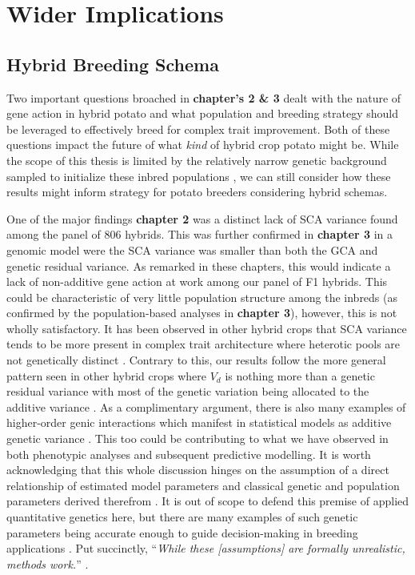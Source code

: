 \documentclass[
]{article}
\begin{document}
\section{Wider Implications}\label{wider-implications}

\subsection{Hybrid Breeding Schema}\label{hybrid-breeding-schema}

Two important questions broached in \textbf{chapter's 2 \& 3} dealt with
the nature of gene action in hybrid potato and what population and
breeding strategy should be leveraged to effectively breed for complex
trait improvement. Both of these questions impact the future of what
\emph{kind} of hybrid crop potato might be. While the scope of this
thesis is limited by the relatively narrow genetic background sampled to
initialize these inbred populations \autocite{Lindhout2018}, we can
still consider how these results might inform strategy for potato
breeders considering hybrid schemas.

One of the major findings \textbf{chapter 2} was a distinct lack of SCA
variance found among the panel of 806 hybrids. This was further
confirmed in \textbf{chapter 3} in a genomic model were the SCA variance
was smaller than both the GCA and genetic residual variance. As remarked
in these chapters, this would indicate a lack of non-additive gene
action at work among our panel of F1 hybrids. This could be
characteristic of very little population structure among the inbreds (as
confirmed by the population-based analyses in \textbf{chapter 3}),
however, this is not wholly satisfactory. It has been observed in other
hybrid crops that SCA variance tends to be more present in complex trait
architecture where heterotic pools are not genetically distinct
\autocite{Zhao2015b}. Contrary to this, our results follow the more
general pattern seen in other hybrid crops where \(V_d\) is nothing more
than a genetic residual variance with most of the genetic variation
being allocated to the additive variance \autocite{Bernardo2016}. As a
complimentary argument, there is also many examples of higher-order
genic interactions which manifest in statistical models as additive
genetic variance \autocite{Hill2008,Monnahan2015}. This too could be
contributing to what we have observed in both phenotypic analyses and
subsequent predictive modelling. It is worth acknowledging that this
whole discussion hinges on the assumption of a direct relationship of
estimated model parameters and classical genetic and population
parameters derived therefrom \autocite{Campos2015}. It is out of scope
to defend this premise of applied quantitative genetics here, but there
are many examples of such genetic parameters being accurate enough to
guide decision-making in breeding applications
\autocite{Walsh2004,Daetwyler2013}. Put succinctly, ``\emph{While these
{[}assumptions{]} are formally unrealistic, methods work.}''
\autocite{Hill2010}.
\end{document}
